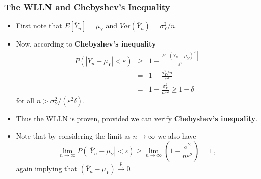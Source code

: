 \documentclass[notes=show,smaller,handout]{beamer}\usepackage[]{graphicx}\usepackage[]{color}
\renewcommand{\Pr}{P}
\newenvironment{stepitemize}{\begin{itemize}[<+->]}{\end{itemize} }
\begin{document}
\begin{frame}%

\frametitle{The WLLN and Chebyshev's Inequality}

\begin{stepitemize}
\item First note that $E[\overline{Y}_n]=\mu_Y$ and $Var(\overline{Y}_n)=\sigma_Y^2/n$.
\item Now, according to \textbf{Chebyshev's inequality}
\begin{eqnarray*}
\Pr \left( |\overline{Y}_{n}-\mu_Y| <\varepsilon\right)  &\geq &1-\frac{E\left[ \left(
\overline{Y}_{n}-\mu_Y \right) ^{2}\right] }{\varepsilon^{2}} \\
&=&1-\frac{\sigma_Y ^{2}/n}{\varepsilon^{2}} \\
&=&1-\frac{\sigma_Y ^{2}}{n\varepsilon^{2}}\geq 1-\delta
\end{eqnarray*}
for all $n>\sigma_Y^2/(\varepsilon^2\delta)$.
\item Thus the WLLN is proven, provided we can verify \textbf{Chebyshev's inequality}.
\item Note that by considering the limit as $n\rightarrow \infty $ we also have%
\begin{equation*}
\lim_{n\rightarrow \infty }\Pr \left( \left\vert \overline{Y}_{n}-\mu_Y\right\vert <\varepsilon\right) \geq \lim_{n\rightarrow \infty }\left( 1-\frac{\sigma^{2}}{n\varepsilon^{2}}\right) =1\,,
\end{equation*}
again implying that $\left( \overline{Y}_{n}-\mu_Y \right) \overset{p}{\rightarrow }0$.
\end{stepitemize}

\end{frame}%
\end{document}
